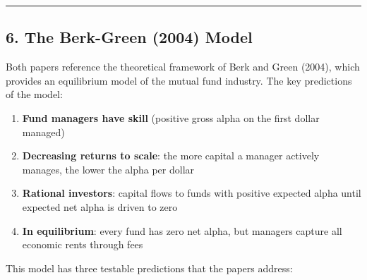 \documentclass[
  letterpaper,
  DIV=11,
  numbers=noendperiod]{scrartcl}
\providecommand{\tightlist}{%
  \setlength{\itemsep}{0pt}\setlength{\parskip}{0pt}}
\begin{document}
\begin{center}\rule{0.5\linewidth}{0.5pt}\end{center}

\subsection{6. The Berk-Green (2004)
Model}\label{the-berk-green-2004-model}

Both papers reference the theoretical framework of Berk and Green
(2004), which provides an equilibrium model of the mutual fund industry.
The key predictions of the model:

\begin{enumerate}
\def\labelenumi{\arabic{enumi}.}
\tightlist
\item
  \textbf{Fund managers have skill} (positive gross alpha on the first
  dollar managed)
\item
  \textbf{Decreasing returns to scale}: the more capital a manager
  actively manages, the lower the alpha per dollar
\item
  \textbf{Rational investors}: capital flows to funds with positive
  expected alpha until expected net alpha is driven to zero
\item
  \textbf{In equilibrium}: every fund has zero net alpha, but managers
  capture all economic rents through fees
\end{enumerate}

This model has three testable predictions that the papers address:
\end{document}
